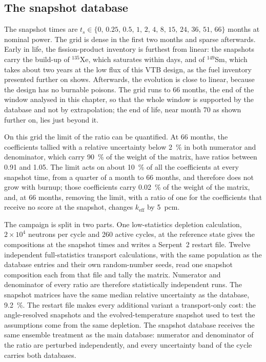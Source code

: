 \subsection{The snapshot database}\label{cs:sec:snapshots}

The snapshot times are $t_s\in\{0,\,0.25,\,0.5,\,1,\,2,\,4,\,8,\,15,\,24,\,36,\,51,\,66\}$
months at nominal power. The grid is dense in the first two months and sparse
afterwards. Early in life, the fission-product inventory is furthest from
linear: the snapshots carry the build-up of $^{135}$Xe, which saturates within
days, and of $^{149}$Sm, which takes about two years at the low flux of this
VTB design, as the fuel inventory presented further on shows. Afterwards, the
evolution is close to linear, because the design has no burnable poisons. The
grid runs to 66 months, the end of the window analysed in this chapter, so
that the whole window is supported by the database and not by extrapolation;
the end of life, near month 70 as shown further on, lies just beyond it.

On this grid the limit of the ratio can be quantified. At 66 months, the
coefficients tallied with a relative uncertainty below \SI{2}{\percent} in both
numerator and denominator, which carry \SI{90}{\percent} of the weight of the
matrix, have ratios between 0.91 and 1.05. The limit acts on about
\SI{10}{\percent} of all the coefficients at every snapshot time, from a quarter of
a month to 66 months, and therefore does not grow with burnup; those
coefficients carry \SI{0.02}{\percent} of the weight of the matrix, and, at 66
months, removing the limit, with a ratio of one for the coefficients that
receive no score at the snapshot, changes $k_{\mathrm{eff}}$ by \SI{5}{pcm}.

The campaign is split in two parts. One low-statistics depletion calculation,
$2\times10^{4}$ neutrons per cycle and 260 active cycles, at the reference
state gives the compositions at the snapshot times and writes a Serpent~2
restart file.
Twelve independent full-statistics transport calculations, with the same
population as the database entries and their own random-number seeds, read one
snapshot composition each from that file and tally the matrix. Numerator and
denominator of every ratio are therefore statistically independent runs. The
snapshot matrices have the same median relative uncertainty as the database,
\SI{9.2}{\percent}. The restart file makes every additional variant a
transport-only cost: the angle-resolved snapshots and the evolved-temperature
snapshot used to test the assumptions come from the same depletion. The
snapshot database receives the same ensemble treatment as the main database:
numerator and denominator of the ratio are perturbed independently, and every
uncertainty band of the cycle carries both databases.

